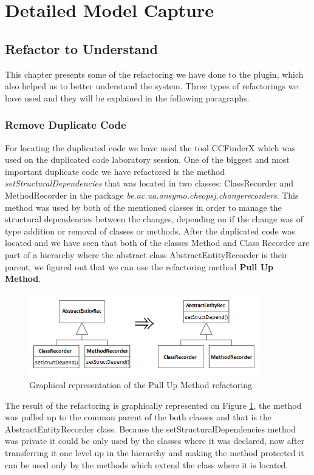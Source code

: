 \documentclass{article}
\begin{document}
\section{Detailed Model Capture}
\subsection{Refactor to Understand}
This chapter presents some of the refactoring we have done to the plugin, which also helped us to better understand the system. Three types of refactorings we have used and they will be explained in the following paragraphs.

\subsubsection{Remove Duplicate Code}
For locating the duplicated code we have used the tool CCFinderX which was used on the duplicated code laboratory session. One of the biggest and most important duplicate code we have refactored is the method \emph{setStructuralDependencies} that was located in two classes: ClassRecorder and MethodRecorder in the package \emph{be.ac.ua.ansymo.cheopsj.changerecorders}. This method was used by both of the mentioned classes in order to manage the structural dependencies between the changes, depending on if the change was of type addition or removal of classes or methods.
After the duplicated code was located and we have seen that both of the classes Method and Class Recorder are part of a hierarchy where the abstract class AbstractEntityRecorder is their parent, we figured out that we can use the refactoring method \textbf{Pull Up Method}.

\begin{figure}[h]
\centering
\includegraphics[width=0.9\textwidth]{Images/PullUpMethod}
\caption{Graphical representation of the Pull Up Method refactoring}
\label{fig:PullUp}
\end{figure}

The result of the refactoring is graphically represented on Figure \ref{fig:PullUp}, the method was pulled up to the common parent of the both classes and that is the AbstractEntityRecorder class. Because the setStructuralDependencies method was private it could be only used by the classes where it was declared, now after transferring it one level up in the hierarchy and making the method protected it can be used only by the methods which extend the class where it is located.
\end{document}
